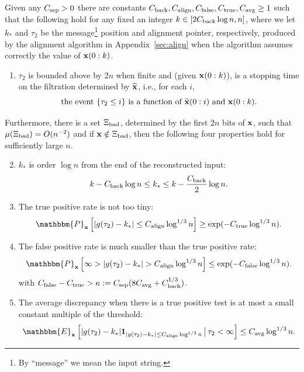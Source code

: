 \documentclass[final,12pt]{colt2018} %
\newcommand{\E}{\mathbbm{E}}
\renewcommand{\P}{\mathbbm{P}}
\newcommand{\1}{\mathbf{1}}
\newcommand{\wt}{\widetilde}
\def\xt{{\wt {\bf x}}}
\def\x{{\bf x}}
\def\csep{C_{\rm sep}} %
\def\cback{C_{\rm back}}
\def\calign{C_{\rm align}}
\def\ctrue{C_{\rm true}}
\def\cfalse{C_{\rm false}}
\def\cavg{C_{\rm avg}}
\def\bad{{\Xi_{\rm bad}}}
\begin{document}
\begin{theorem} \label{th:align}
	Given any $\csep>0$ there are constants $\cback, \calign, \cfalse, \ctrue, \cavg \geq 1$ such that the following hold for any fixed an integer $k \in [2 \cback \log n ,  n]$, where we let $k_*$ and $\tau_2$
	be the message\footnote{By ``message'' we mean the input string.} position and alignment pointer, respectively, produced
	by the alignment algorithm in Appendix~\ref{sec:align} when the algorithm
	assumes correctly the value of $\x(0:k)$.
	\begin{enumerate}[$(i)$]
		\item $\tau_2$ is bounded above by $2n$ when finite and (given $\x(0:k)$), is
		a stopping time on the filtration determined by $\xt$, i.e., for each $i$,
		$$\mbox{the event } \{ \tau_2 \leq i \} \mbox{ is a function of }
		\wt\x(0:i) \mbox{ and } \x(0:k).$$
		\label{r:i}
	\end{enumerate}
	\vspace{-25pt}
	Furthermore, there is a set $\bad$, determined by the first
	$2n$ bits of $\x$, such that $\mu(\bad) = O(n^{-2})$ and if
	$\x \notin \bad$, then the following four properties hold for
	sufficiently large $n$.
	\begin{enumerate}[$(i)$] \setcounter{enumi}{1}
		\item $k_*$ is order $\log n$ from the end of the reconstructed input:
		$$k - \cback \log n \leq k_* \leq k - \frac{\cback}{2} \log n.$$
		\label{r:ii}
		\item The true positive rate is not too tiny:
		$$\P_\x \left [ |g(\tau_2) - k_*| \leq \calign \log^{1/3} n \right ]
		\geq \exp (-\ctrue \log^{1/3} n ).$$
		\label{r:iii}
		\item The false positive rate is much smaller than the true positive rate:
		$$\P_\x \left [ \infty > |g(\tau_2) - k_*| > \calign \log^{1/3} n \right ]
		\leq \exp(- \cfalse \log^{1/3} n).$$
		with $\cfalse - \ctrue > \kappa := \csep ( 8 \cavg + \cback^{1/3} )$.
		\label{r:iv}
		\item The average discrepancy when there is a true positive test
		is at most a small constant multiple of the threshold:
		$$\E_{\x} \left [ |g(\tau_2) - k_*|
		\1_{|g(\tau_2) - k_*| \leq \calign \log^{1/3} n} \, \big{|} \,
		\tau_2 < \infty \right ] \leq \cavg \log^{1/3} n.$$
		\label{r:v}
	\end{enumerate}
\end{theorem}
\end{document}
